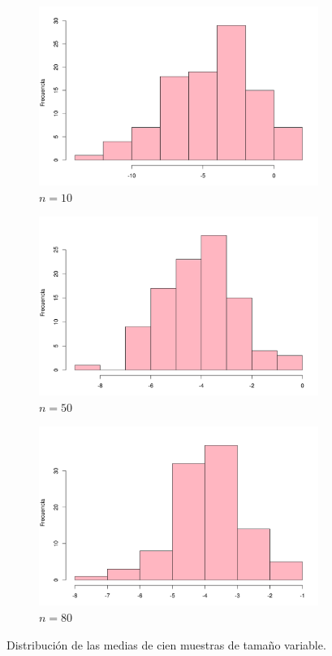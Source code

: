\documentclass[12pt]{article}
\begin{document}
	\begin{figure}
		\begin{subfigure}{\textwidth}
			\centering
			\includegraphics[scale=0.5]{meangap_10.png}
			\caption{$n=10$}
		\end{subfigure}
	
		\begin{subfigure}{\textwidth}
			\centering
			\includegraphics[scale=0.5]{meangap_50.png}
			\caption{$n=50$}
		\end{subfigure}
	
		\begin{subfigure}{\textwidth}
			\centering
			\includegraphics[scale=0.5]{meangap_80.png}
			\caption{$n=80$}
		\end{subfigure}
	\caption{Distribución de las medias de cien muestras de tamaño variable.}
	\label{gaps}
	\end{figure}
	


\end{document}
